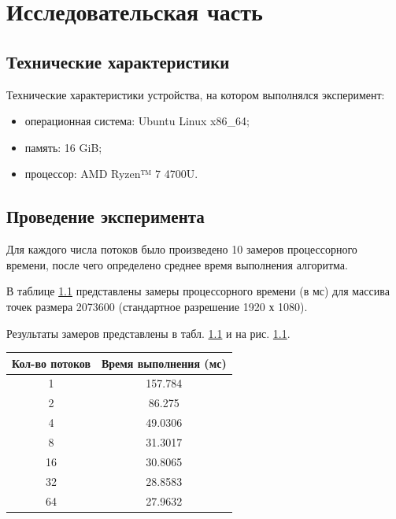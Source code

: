 \chapter{Исследовательская часть}

\section{Технические характеристики}

Технические характеристики устройства, на котором выполнялся эксперимент:
\begin{itemize}
	\item операционная система: Ubuntu\cite{ubuntu} Linux x86\_64;
	\item память: 16 GiB;
	\item процессор: AMD Ryzen™ 7 4700U\cite{amd}.
\end{itemize}

\section{Проведение эксперимента}

Для каждого числа потоков было произведено 10 замеров процессорного времени, 
после чего определено среднее время выполнения алгоритма.

В таблице \ref{tab:profiling-1} представлены замеры процессорного времени (в мс)
для массива точек размера 2073600 (стандартное разрешение 1920 х 1080).

Результаты замеров представлены в табл. \ref{tab:profiling-1} и на рис. \ref{tab:profiling-1}.
\begin{table}[!ht]
	\begin{center}
		\begin{tabular}{|c|c|} 
			\hline
			Кол-во потоков & Время выполнения (мс) \\  
			\hline
			1 & 157.784 \\
			\hline
			2 & 86.275 \\
			\hline
			4 & 49.0306  \\
			\hline
			8 & 31.3017 \\
			\hline
			16 & 30.8065 \\
			\hline
			32 & 28.8583\\
			\hline
			64 & 27.9632 \\
			\hline
		\end{tabular}
		\label{tab:profiling-1}
	\end{center}
\end{table}

